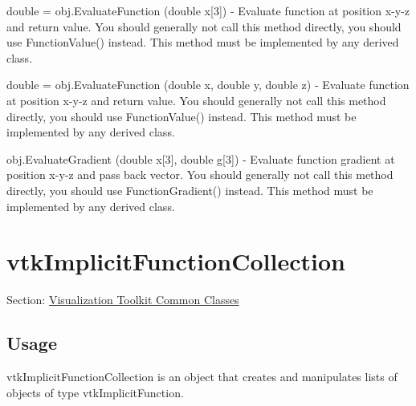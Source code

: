 \begin{DoxyItemize}
\item {\ttfamily double = obj.\-Evaluate\-Function (double x\mbox{[}3\mbox{]})} -\/ Evaluate function at position x-\/y-\/z and return value. You should generally not call this method directly, you should use Function\-Value() instead. This method must be implemented by any derived class.  
\item {\ttfamily double = obj.\-Evaluate\-Function (double x, double y, double z)} -\/ Evaluate function at position x-\/y-\/z and return value. You should generally not call this method directly, you should use Function\-Value() instead. This method must be implemented by any derived class.  
\item {\ttfamily obj.\-Evaluate\-Gradient (double x\mbox{[}3\mbox{]}, double g\mbox{[}3\mbox{]})} -\/ Evaluate function gradient at position x-\/y-\/z and pass back vector. You should generally not call this method directly, you should use Function\-Gradient() instead. This method must be implemented by any derived class.  
\end{DoxyItemize}\hypertarget{vtkcommon_vtkimplicitfunctioncollection}{}\section{vtk\-Implicit\-Function\-Collection}\label{vtkcommon_vtkimplicitfunctioncollection}
Section\-: \hyperlink{sec_vtkcommon}{Visualization Toolkit Common Classes} \hypertarget{vtkwidgets_vtkxyplotwidget_Usage}{}\subsection{Usage}\label{vtkwidgets_vtkxyplotwidget_Usage}
vtk\-Implicit\-Function\-Collection is an object that creates and manipulates lists of objects of type vtk\-Implicit\-Function.

